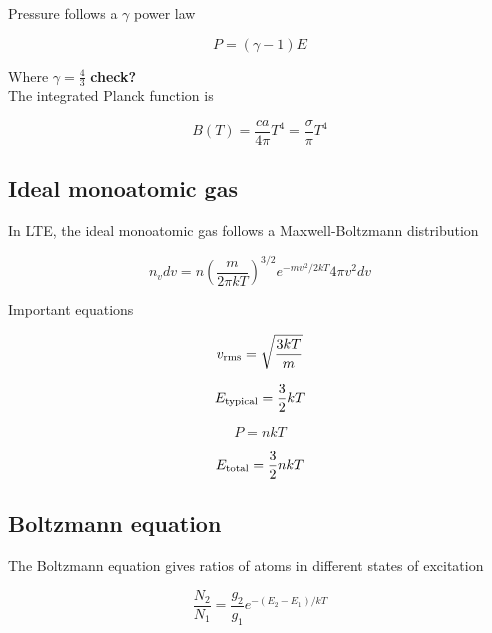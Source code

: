 \documentclass{article}
\begin{document}
Pressure follows a $\gamma$ power law

\begin{equation}
    P = (\gamma - 1)E
\end{equation}

Where $\gamma = \frac{4}{3}$ \textbf{check?}\\

The integrated Planck function is 

\begin{equation}
    B(T) = \frac{ca}{4\pi}T^4 = \frac{\sigma}{\pi}T^4
\end{equation}

\subsection{Ideal monoatomic gas}

In LTE, the ideal monoatomic gas follows a Maxwell-Boltzmann distribution

\begin{equation}
    n_vdv = n\left(\frac{m}{2\pi kT}\right)^{3/2}e^{-mv^2/2kT}4\pi v^2 dv
\end{equation}

Important equations

\begin{equation}
    v_{\rm rms} = \sqrt{\frac{3kT}{m}}
\end{equation}

\begin{equation}
    E_{\rm typical} = \frac{3}{2}kT
\end{equation}

\begin{equation}
    P = nkT
\end{equation}

\begin{equation}
    E_{\rm total} = \frac{3}{2}nkT
\end{equation}

\subsection{Boltzmann equation}

The Boltzmann equation gives ratios of atoms in different states of excitation

\begin{equation}
    \frac{N_2}{N_1} = \frac{g_2}{g_1}e^{-(E_2 - E_1)/kT}
\end{equation}
\end{document}
